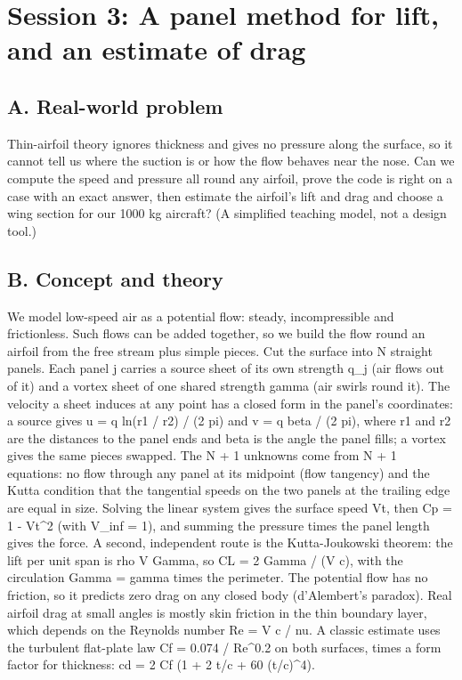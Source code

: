 \documentclass[11pt,a4paper]{article}
\begin{document}
\section{Session 3: A panel method for lift, and an estimate of drag}

\subsection*{A. Real-world problem}
Thin-airfoil theory ignores thickness and gives no pressure along the surface, so it cannot tell us where the suction is or how the flow behaves near the nose. Can we compute the speed and pressure all round any airfoil, prove the code is right on a case with an exact answer, then estimate the airfoil's lift and drag and choose a wing section for our 1000 kg aircraft? (A simplified teaching model, not a design tool.)

\subsection*{B. Concept and theory}
We model low-speed air as a potential flow: steady, incompressible and frictionless. Such flows can be added together, so we build the flow round an airfoil from the free stream plus simple pieces. Cut the surface into N straight panels. Each panel j carries a source sheet of its own strength q\_j (air flows out of it) and a vortex sheet of one shared strength gamma (air swirls round it). The velocity a sheet induces at any point has a closed form in the panel's coordinates: a source gives u = q ln(r1 / r2) / (2 pi) and v = q beta / (2 pi), where r1 and r2 are the distances to the panel ends and beta is the angle the panel fills; a vortex gives the same pieces swapped. The N + 1 unknowns come from N + 1 equations: no flow through any panel at its midpoint (flow tangency) and the Kutta condition that the tangential speeds on the two panels at the trailing edge are equal in size. Solving the linear system gives the surface speed Vt, then Cp = 1 - Vt\textasciicircum{}2 (with V\_inf = 1), and summing the pressure times the panel length gives the force. A second, independent route is the Kutta-Joukowski theorem: the lift per unit span is rho V Gamma, so CL = 2 Gamma / (V c), with the circulation Gamma = gamma times the perimeter. The potential flow has no friction, so it predicts zero drag on any closed body (d'Alembert's paradox). Real airfoil drag at small angles is mostly skin friction in the thin boundary layer, which depends on the Reynolds number Re = V c / nu. A classic estimate uses the turbulent flat-plate law Cf = 0.074 / Re\textasciicircum{}0.2 on both surfaces, times a form factor for thickness: cd = 2 Cf (1 + 2 t/c + 60 (t/c)\textasciicircum{}4).
\end{document}

